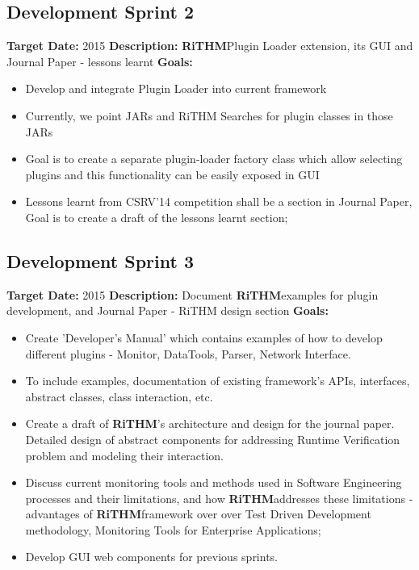 \documentclass[]{article}
\newcommand{\rithm}{\textbf{RiTHM}\space}
\begin{document}
\subsection{Development Sprint 2}
\textbf{Target Date:}\space {} {2015}\newline
\textbf{Description:} \rithm Plugin Loader extension,  its GUI and Journal Paper - lessons learnt\newline
\textbf{Goals:}
\begin{itemize}
\item
Develop and integrate Plugin Loader into current framework
\item
Currently, we point JARs and RiTHM Searches for plugin classes in those JARs
\item
Goal is to create a separate plugin-loader factory class which allow selecting plugins and this functionality can be
easily exposed in GUI
\item
Lessons learnt from CSRV'14 competition shall be a section in Journal Paper, Goal is to create a draft of the lessons learnt section; 
 
\end{itemize}

\subsection{Development Sprint 3}
\textbf{Target Date:}\space {} {2015}\newline
\textbf{Description:} Document \rithm examples for plugin development, and Journal Paper - RiTHM design section\newline
\textbf{Goals:}
\begin{itemize}
	\item
	Create 'Developer's Manual' which contains examples of how to develop different plugins - Monitor, DataTools, Parser, Network Interface.
	\item
	To include examples, documentation of existing framework's APIs, interfaces, abstract classes, class interaction, etc.
	\item
	Create a draft of \rithm's architecture and design for the journal paper. Detailed design of abstract components for addressing Runtime Verification problem and modeling their interaction.
	\item
	Discuss current monitoring tools and methods used in Software Engineering processes and their limitations, and how \rithm addresses these limitations - advantages of \rithm framework over over Test Driven Development methodology, Monitoring Tools for Enterprise Applications; 
	\item
	Develop GUI web components for previous sprints. 
\end{itemize}
\end{document}
